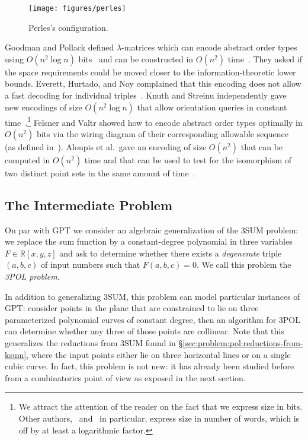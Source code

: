 \begin{figure}
	\centering{}
	\texttt{[image: figures/perles]}
	\caption{Perles's configuration.}\label{fig:perles}
\end{figure}

Goodman and Pollack defined \(\lambda\)-matrices which can encode abstract order
types using \( O(n^2 \log{n}) \) bits~\cite{GP83} and can be constructed in
\(O(n^2)\) time~\cite{EOS86}. They asked if the space
requirements could be moved closer to the information-theoretic lower bounds.
Everett, Hurtado, and Noy complained that this encoding does not
allow a fast decoding for individual triples~\cite{EHN99}.
Knuth and Streinu independently gave new encodings of size \(O(n^2 \log n)\)
that allow orientation queries in constant time~\cite{Knu92,St97}.\footnote{%
We attract the attention of the reader on the fact that we express size in
bits.
Other authors,~\cite{EHN99} and~\cite{St97} in particular,
express size in number of words, which is off by at least a logarithmic factor.}
Felsner and Valtr showed how to encode abstract order types optimally in
\(O(n^2)\) bits via the wiring diagram of their corresponding allowable
sequence~\cite{Fe96, FV11} (as defined in~\cite{Go80}). Aloupis et al.\ gave
an encoding of size \(O(n^2)\) that can be computed in \(O(n^2)\) time and that
can be used to test for the isomorphism of two distinct point sets in the same
amount of time~\cite{AILOW14}.

\subsection{The Intermediate Problem}
\label{sec:problem:pol:3pol}

On par with GPT we consider an algebraic generalization of the 3SUM problem:
we replace the sum function by a constant-degree polynomial in three variables
$F \in \mathbb{R}[x,y,z]$ and ask to determine whether there exists a
\emph{degenerate} triple $(a,b,c)$ of input numbers such that $F(a,b,c)=0$. We
call this problem the \emph{3POL problem}.
%


In addition to generalizing 3SUM, this problem can model particular
instances of GPT: consider points in the plane that are constrained to
lie on three parameterized polynomial curves of constant degree, then an
algorithm for 3POL can determine whether any three of those points are
collinear. Note that this generalizes the reductions from 3SUM found in
\S\ref{sec:problem:pol:reductions-from-ksum}, where the input points either lie
on three horizontal lines or on a single cubic curve.
%
In fact, this problem is not new: it has already been studied before from a
combinatorics point of view as exposed in the next section.

